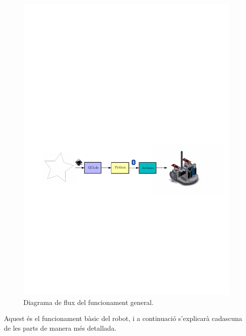 \begin{figure}[H]
	\centering
	\includegraphics{Flux}
	\caption{Diagrama de flux del funcionament general.}
	\label{fig:flux}
\end{figure}

Aquest és el funcionament bàsic del robot, i a continuació s'explicarà cadascuna de les parts de manera més detallada. 












